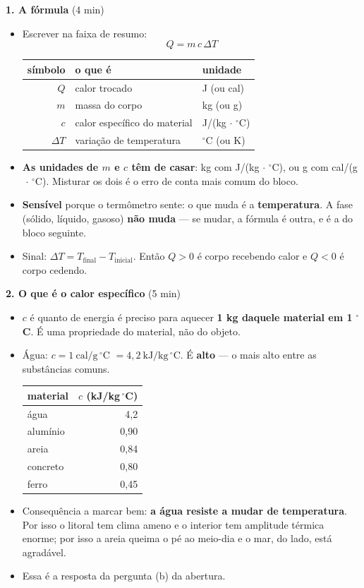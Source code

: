 \documentclass[11pt,a4paper]{article}
\makeatletter
\newcommand{\variaveis}[1]{%
  \begingroup\footnotesize
  \setlength{\tabcolsep}{6pt}
  \renewcommand{\arraystretch}{1.15}
  \begin{center}
  \begin{tabular}{@{}rll@{}}
    \toprule
    \textbf{s\'imbolo} & \textbf{o que \'e} & \textbf{unidade} \\
    \midrule
    #1
    \bottomrule
  \end{tabular}
  \end{center}
  \endgroup}
\makeatother
\begin{document}
\begin{quadro}
\textbf{1. A f\'ormula} (4 min)
\begin{itemize}[nosep]
  \item Escrever na faixa de resumo:
  \[
    \boxed{Q = m\,c\,\Delta T}
  \]
  \variaveis{
    $Q$        & calor trocado                & J (ou cal) \\
    $m$        & massa do corpo               & kg (ou g) \\
    $c$        & calor espec\'ifico do material & J/(kg$\,\cdot\,$$^\circ$C) \\
    $\Delta T$ & varia\c{c}\~ao de temperatura & $^\circ$C (ou K) \\
  }
  \item \textbf{As unidades de $m$ e $c$ t\^em de casar}: kg com
        J/(kg$\,\cdot\,$$^\circ$C), ou g com cal/(g$\,\cdot\,$$^\circ$C).
        Misturar os dois \'e o erro de conta mais comum do bloco.
  \item \textbf{Sens\'ivel} porque o term\^ometro sente: o que muda \'e a
        \textbf{temperatura}. A fase (s\'olido, l\'iquido, gasoso)
        \textbf{n\~ao muda} --- se mudar, a f\'ormula \'e outra, e \'e a do
        bloco seguinte.
  \item Sinal: $\Delta T = T_{\text{final}} - T_{\text{inicial}}$. Ent\~ao
        $Q > 0$ \'e corpo recebendo calor e $Q < 0$ \'e corpo cedendo.
\end{itemize}

\medskip
\textbf{2. O que \'e o calor espec\'ifico} (5 min)
\begin{itemize}[nosep]
  \item $c$ \'e quanto de energia \'e preciso para aquecer \textbf{1 kg
        daquele material em 1} $^\circ$\textbf{C}. \'E uma propriedade do
        material, n\~ao do objeto.
  \item \'Agua: $c = 1\ \text{cal/g}\,^\circ$C $= 4{,}2\ \text{kJ/kg}\,^\circ$C.
        \'E \textbf{alto} --- o mais alto entre as subst\^ancias comuns.
  \begin{center}\small
    \begin{tabular}{@{}lr@{}}
      \toprule
      material & $c$ (kJ/kg$\,^\circ$C) \\
      \midrule
      \'agua       & 4{,}2 \\
      alum\'inio   & 0{,}90 \\
      areia      & 0{,}84 \\
      concreto   & 0{,}80 \\
      ferro      & 0{,}45 \\
      \bottomrule
    \end{tabular}
  \end{center}
  \item Consequ\^encia a marcar bem: \textbf{a \'agua resiste a mudar de
        temperatura}. Por isso o litoral tem clima ameno e o interior
        tem amplitude t\'ermica enorme; por isso a areia queima o p\'e ao
        meio-dia e o mar, do lado, est\'a agrad\'avel.
  \item Essa \'e a resposta da pergunta (b) da abertura.
\end{itemize}


\end{quadro}
\end{document}

